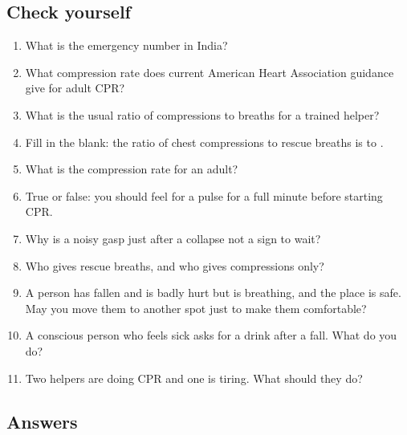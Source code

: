 \subsection*{Check yourself}

\begin{enumerate}
\item What is the emergency number in India?
\item What compression rate does current American Heart Association guidance give for adult CPR?
\item What is the usual ratio of compressions to breaths for a trained helper?
\item Fill in the blank: the ratio of chest compressions to rescue breaths is \underline{\hspace{1cm}} to \underline{\hspace{1cm}}.
\item What is the compression rate for an adult?
\item True or false: you should feel for a pulse for a full minute before starting CPR.
\item Why is a noisy gasp just after a collapse not a sign to wait?
\item Who gives rescue breaths, and who gives compressions only?
\item A person has fallen and is badly hurt but is breathing, and the place is safe. May you move them to another spot just to make them comfortable?
\item A conscious person who feels sick asks for a drink after a fall. What do you do?
\item Two helpers are doing CPR and one is tiring. What should they do?
\end{enumerate}

\subsection*{Answers}

